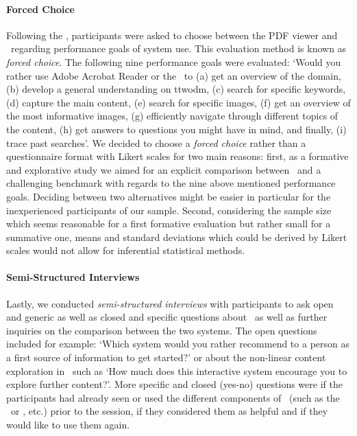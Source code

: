 \paragraph*{Forced Choice} 
Following the \cwt, participants were asked to choose between the PDF viewer and \apluschis\ regarding performance goals of system use. 
%
This evaluation method is known as \emph{forced choice}. 
%
The following nine performance goals were evaluated: `Would you rather use Adobe Acrobat Reader or the \apluschis\ to 
(a) get an overview of the domain, 
(b) develop a general understanding on \acrshort{ttwodm}, 
(c) search for specific keywords, 
(d) capture the main content, 
(e) search for specific images, 
(f) get an overview of the most informative images, 
(g) efficiently navigate through different topics of the content, 
(h) get answers to questions you might have in mind, and finally, 
(i) trace past searches'. 
%
We decided to choose a \emph{forced choice} rather than a questionnaire format with Likert scales for two main reasons: first, as a formative and explorative study we aimed for an explicit comparison between \apluschis\ and a challenging benchmark with regards to the nine above mentioned performance goals. 
%
Deciding between two alternatives might be easier in particular for the inexperienced participants of our sample. 
%
Second, considering the sample size which seems reasonable for a first formative evaluation but rather small for a summative one, means and standard deviations which could be derived by Likert scales would not allow for inferential statistical methods.




\paragraph*{Semi-Structured Interviews} 
Lastly, we conducted \emph{semi-structured interviews} with participants to ask open and generic as well as closed and specific questions about \apluschis\ as well as further inquiries on the comparison between the two systems. 
%
The open questions included for example: `Which system would you rather recommend to a person as a first source of information to get started?' or about the non-linear content exploration in \apluschis\ such as ‘How much does this interactive system encourage you to explore further content?’. 
%
More specific and closed (yes-no) questions were if the participants had already seen or used the different components of \apluschis\ (such as the \WordCloud\ or \ImageSlider, etc.) prior to the session, if they considered them as helpful and if they would like to use them again.




